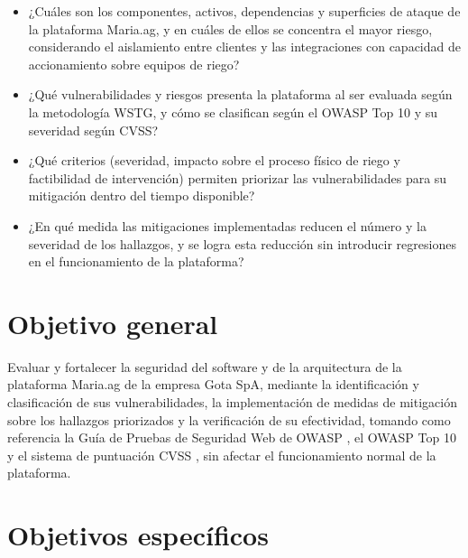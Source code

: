 \documentclass[12pt,letterpaper]{report}
\begin{document}
\begin{itemize}[leftmargin=1.25cm]
    \item ¿Cuáles son los componentes, activos, dependencias y superficies de ataque de la plataforma Maria.ag, y en cuáles de ellos se concentra el mayor riesgo, considerando el aislamiento entre clientes y las integraciones con capacidad de accionamiento sobre equipos de riego?
    \item ¿Qué vulnerabilidades y riesgos presenta la plataforma al ser evaluada según la metodología WSTG, y cómo se clasifican según el OWASP Top 10 y su severidad según CVSS?
    \item ¿Qué criterios (severidad, impacto sobre el proceso físico de riego y factibilidad de intervención) permiten priorizar las vulnerabilidades para su mitigación dentro del tiempo disponible?
    \item ¿En qué medida las mitigaciones implementadas reducen el número y la severidad de los hallazgos, y se logra esta reducción sin introducir regresiones en el funcionamiento de la plataforma?
\end{itemize}

\newpage

\chapter*{Objetivo general}

Evaluar y fortalecer la seguridad del software y de la arquitectura de la plataforma Maria.ag de la empresa Gota SpA, mediante la identificación y clasificación de sus vulnerabilidades, la implementación de medidas de mitigación sobre los hallazgos priorizados y la verificación de su efectividad, tomando como referencia la Guía de Pruebas de Seguridad Web de OWASP \autocite{owasp2024wstg}, el OWASP Top 10 \autocite{owasp2025top10} y el sistema de puntuación CVSS \autocite{first2023cvss}, sin afectar el funcionamiento normal de la plataforma.

\newpage

\chapter*{Objetivos específicos}
\end{document}
